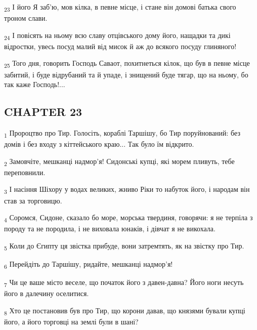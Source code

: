 \begin{tcolorbox}
\textsubscript{23} І його Я заб'ю, мов кілка, в певне місце, і стане він домові батька свого троном слави.
\end{tcolorbox}
\begin{tcolorbox}
\textsubscript{24} І повісять на ньому всю славу отцівського дому його, нащадки та дикі відростки, увесь посуд малий від мисок й аж до всякого посуду глиняного!
\end{tcolorbox}
\begin{tcolorbox}
\textsubscript{25} Того дня, говорить Господь Саваот, похитнеться кілок, що був в певне місце забитий, і буде відрубаний та й упаде, і знищений буде тягар, що на ньому, бо так каже Господь!...
\end{tcolorbox}
\subsection{CHAPTER 23}
\begin{tcolorbox}
\textsubscript{1} Пророцтво про Тир. Голосіть, кораблі Таршішу, бо Тир поруйнований: без домів і без входу з кіттейського краю... Так було їм відкрито.
\end{tcolorbox}
\begin{tcolorbox}
\textsubscript{2} Замовчіте, мешканці надмор'я! Сидонські купці, які морем пливуть, тебе переповнили.
\end{tcolorbox}
\begin{tcolorbox}
\textsubscript{3} І насіння Шіхору у водах великих, жниво Ріки то набуток його, і народам він став за торговицю.
\end{tcolorbox}
\begin{tcolorbox}
\textsubscript{4} Соромся, Сидоне, сказало бо море, морська твердиня, говорячи: я не терпіла з породу та не породила, і не виховала юнаків, і дівчат я не викохала.
\end{tcolorbox}
\begin{tcolorbox}
\textsubscript{5} Коли до Єгипту ця звістка прибуде, вони затремтять, як на звістку про Тир.
\end{tcolorbox}
\begin{tcolorbox}
\textsubscript{6} Перейдіть до Таршішу, ридайте, мешканці надмор'я!
\end{tcolorbox}
\begin{tcolorbox}
\textsubscript{7} Чи це ваше місто веселе, що початок його з давен-давна? Його ноги несуть його в далечину оселитися.
\end{tcolorbox}
\begin{tcolorbox}
\textsubscript{8} Хто це постановив був про Тир, що корони давав, що князями бували купці його, а його торговці на землі були в шані?
\end{tcolorbox}
